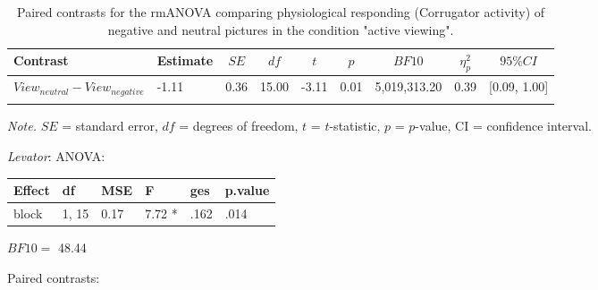 \documentclass[
  english,
  man,floatsintext]{apa6}
\begin{document}
\begin{table}[H]

\begin{center}
\begin{threeparttable}

\caption{\label{tab:unnamed-chunk-5}Paired contrasts for the rmANOVA comparing physiological responding (Corrugator activity) of negative and neutral pictures in the condition "active viewing".}

\begin{tabular}{lllllllll}
\toprule
Contrast & \multicolumn{1}{c}{Estimate} & \multicolumn{1}{c}{$SE$} & \multicolumn{1}{c}{$df$} & \multicolumn{1}{c}{$t$} & \multicolumn{1}{c}{$p$} & \multicolumn{1}{c}{$BF10$} & \multicolumn{1}{c}{$\eta_{p}^{2}$} & \multicolumn{1}{c}{$95\% CI$}\\
\midrule
$View_{neutral} - View_{negative}$ & -1.11 & 0.36 & 15.00 & -3.11 & 0.01 & 5,019,313.20 & 0.39 & {}[0.09, 1.00]\\
\bottomrule
\addlinespace
\end{tabular}

\begin{tablenotes}[para]
\normalsize{\textit{Note.} $SE$ = standard error, $df$ = degrees of freedom, $t$ = $t$-statistic, $p$ = $p$-value, CI = confidence interval.}
\end{tablenotes}

\end{threeparttable}
\end{center}

\end{table}

\emph{Levator}:
ANOVA:

\begin{tabular}{l|l|l|l|l|l}
\hline
Effect & df & MSE & F & ges & p.value\\
\hline
block & 1, 15 & 0.17 & 7.72 * & .162 & .014\\
\hline
\end{tabular}

\(BF10=\) 48.44

Paired contrasts:
\end{document}
